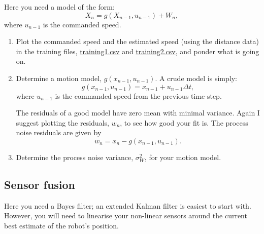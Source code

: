\documentclass[a4paper, 12pt]{article}
\newcommand{\var}[1]{\sigma_{#1}^2}
\begin{document}
Here you need a model of the form:
%
\begin{equation}
  X_n = g(X_{n-1}, u_{n-1}) + W_n,
\end{equation}
%
where $u_{n-1}$ is the commanded speed.

\begin{enumerate}
\item Plot the commanded speed and the estimated speed (using the
  distance data) in the training files, \url{training1.csv} and
  \url{training2.csv}, and ponder what is going on.

\item Determine a motion model, $g(x_{n-1}, u_{n-1})$.  A crude model
  is simply:
  \begin{equation}
    g(x_{n-1}, u_{n-1}) = x_{n-1} + u_{n-1} \Delta t,
  \end{equation}
  where $u_{n-1}$ is the commanded speed from the previous time-step.

  The residuals of a good model have zero mean with minimal variance.
  Again I suggest plotting the residuals, $w_n$, to see how good your
  fit is.  The process noise residuals are given by
  \begin{equation}
    w_n = x_n - g(x_{n-1}, u_{n-1}).
  \end{equation}

\item Determine the process noise variance, $\var{W}$, for your motion model.

\end{enumerate}


\subsection{Sensor fusion}


Here you need a Bayes filter; an extended Kalman filter is easiest to
start with.  However, you will need to linearise your non-linear
sensors around the current best estimate of the robot's position.
\end{document}
